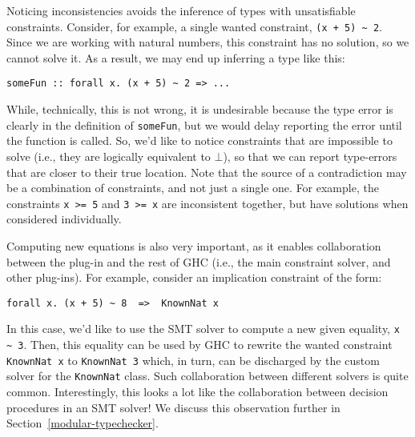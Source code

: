 \documentclass{sigplanconf}
\begin{document}
Noticing inconsistencies avoids the inference of types with unsatisfiable
constraints.  Consider, for example, a single wanted constraint,
\Verb"(x + 5) ~ 2".  Since we are working with natural numbers,
this constraint has no solution, so we cannot solve it.
As a result, we may end up inferring a type like this:
\begin{Verbatim}
someFun :: forall x. (x + 5) ~ 2 => ...
\end{Verbatim}
While, technically, this is not wrong, it is undesirable because the type
error is clearly in the definition of \Verb"someFun", but we would delay
reporting the error until the function is called.  So, we'd like to
notice constraints that are impossible to solve (i.e., they are logically
equivalent to $\bot$), so that we can report type-errors that are closer
to their true location.  Note that the source of a contradiction may
be a combination of constraints, and not just a single one.  For example,
the constraints \Verb"x >= 5" and \Verb"3 >= x" are inconsistent together,
but have solutions when considered individually.

Computing new equations is also very important, as it enables collaboration
between the plug-in and the rest of GHC (i.e., the main constraint solver,
and other plug-ins).  For example, consider an implication constraint
of the form:
\begin{Verbatim}
forall x. (x + 5) ~ 8  =>  KnownNat x
\end{Verbatim}
In this case, we'd like to use the SMT solver to compute a new given
equality, \Verb"x ~ 3".  Then, this equality can be used by GHC to
rewrite the wanted constraint \Verb"KnownNat x" to \Verb"KnownNat 3"
which, in turn, can be discharged by the custom solver for the \Verb"KnownNat"
class.  Such collaboration between different solvers is quite common.
Interestingly, this looks a lot like the collaboration between decision
procedures in an SMT solver!  We discuss this observation further
in Section~\ref{modular-typechecker}.


\end{document}
